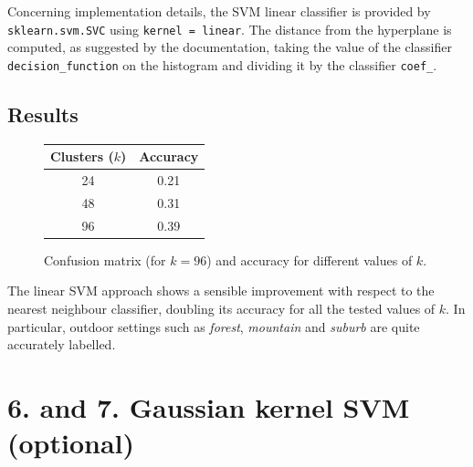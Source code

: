 \documentclass[12pt]{article}
\begin{document}
  Concerning implementation details, the SVM linear classifier is provided by \texttt{sklearn.svm.SVC} using \texttt{kernel = linear}. The distance from the hyperplane is computed, as suggested by the documentation, taking the value of the classifier \texttt{decision\_function} on the histogram and dividing it by the classifier \texttt{coef\_}.

  \subsection*{Results}

  \begin{figure}[H]
    \centering
    \caption*{Confusion matrix (for \( k = 96 \)) and accuracy for different values of \( k \).}
    \quad\quad\quad
    \begin{tabular}[b]{cc}
			\toprule
      Clusters (\( k \)) & Accuracy \\
      \midrule
      24  & 0.21 \\
      48  & 0.31 \\
      96  & 0.39 \\
      \bottomrule
    \end{tabular}
  \end{figure}

  The linear SVM approach shows a sensible improvement with respect to the nearest neighbour classifier, doubling its accuracy for all the tested values of \( k \). In particular, outdoor settings such as \textit{forest}, \textit{mountain} and \textit{suburb} are quite accurately labelled.
  



  \section*{6. and 7. Gaussian kernel SVM (optional)}
\end{document}
